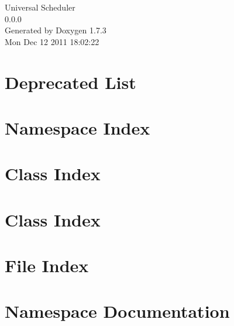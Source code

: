 \documentclass[a4paper]{book}
\begin{document}
\hypersetup{pageanchor=false}
\begin{titlepage}
\vspace*{7cm}
\begin{center}
{\Large Universal Scheduler \\[1ex]\large 0.0.0 }\\
\vspace*{1cm}
{\large Generated by Doxygen 1.7.3}\\
\vspace*{0.5cm}
{\small Mon Dec 12 2011 18:02:22}\\
\end{center}
\end{titlepage}
\clearemptydoublepage
{}
\tableofcontents
\clearemptydoublepage
{}
\hypersetup{pageanchor=true}
\chapter{Deprecated List}
\label{deprecated}
\hypertarget{deprecated}{}

\chapter{Namespace Index}

\chapter{Class Index}

\chapter{Class Index}

\chapter{File Index}

\chapter{Namespace Documentation}





\end{document}
